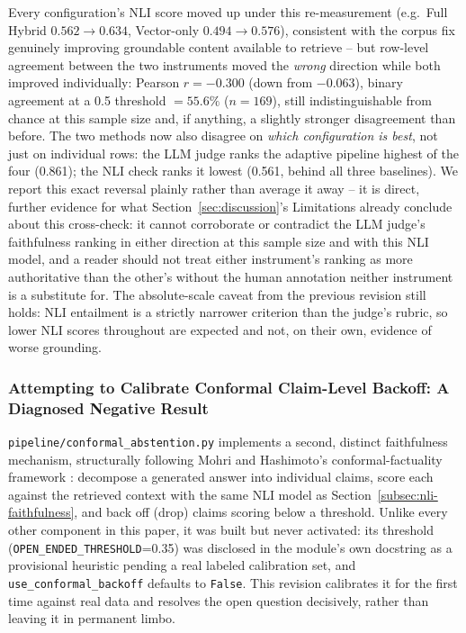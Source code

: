 \documentclass[a4paper,twoside]{article}
\begin{document}
Every configuration's NLI score moved up under this re-measurement (e.g.\ Full Hybrid $0.562\to0.634$, Vector-only $0.494\to0.576$), consistent with the corpus fix genuinely improving groundable content available to retrieve -- but row-level agreement between the two instruments moved the \emph{wrong} direction while both improved individually: Pearson $r=-0.300$ (down from $-0.063$), binary agreement at a 0.5 threshold $=55.6\%$ ($n=169$), still indistinguishable from chance at this sample size and, if anything, a slightly stronger disagreement than before. The two methods now also disagree on \emph{which configuration is best}, not just on individual rows: the LLM judge ranks the adaptive pipeline highest of the four (0.861); the NLI check ranks it lowest (0.561, behind all three baselines). We report this exact reversal plainly rather than average it away -- it is direct, further evidence for what Section~\ref{sec:discussion}'s Limitations already conclude about this cross-check: it cannot corroborate or contradict the LLM judge's faithfulness ranking in either direction at this sample size and with this NLI model, and a reader should not treat either instrument's ranking as more authoritative than the other's without the human annotation neither instrument is a substitute for. The absolute-scale caveat from the previous revision still holds: NLI entailment is a strictly narrower criterion than the judge's rubric, so lower NLI scores throughout are expected and not, on their own, evidence of worse grounding.

\subsubsection{Attempting to Calibrate Conformal Claim-Level Backoff: A Diagnosed Negative Result}
\label{subsec:conformal-calibration}

\texttt{pipeline/conformal\_abstention.py} implements a second, distinct faithfulness mechanism, structurally following Mohri and Hashimoto's conformal-factuality framework \citep{mohri2024conformal}: decompose a generated answer into individual claims, score each against the retrieved context with the same NLI model as Section~\ref{subsec:nli-faithfulness}, and back off (drop) claims scoring below a threshold. Unlike every other component in this paper, it was built but never activated: its threshold (\texttt{OPEN\_ENDED\_THRESHOLD}=0.35) was disclosed in the module's own docstring as a provisional heuristic pending a real labeled calibration set, and \texttt{use\_conformal\_backoff} defaults to \texttt{False}. This revision calibrates it for the first time against real data and resolves the open question decisively, rather than leaving it in permanent limbo.
\end{document}
